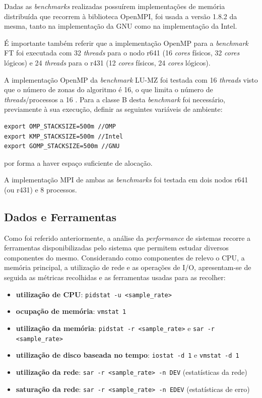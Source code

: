 \documentclass{article}
\begin{document}
Dadas as \textit{benchmarks} realizadas possuírem implementações de memória distribuída que recorrem à biblioteca OpenMPI, foi usada a versão
1.8.2 da mesma, tanto na implementação da GNU como na implementação da Intel.

É importante também referir que a implementação OpenMP para a \textit{benchmark} FT foi executada com 32 \textit{threads} para o nodo r641 
(16 \textit{cores} físicos, 32 \textit{cores} lógicos) e 24 \textit{threads} para o r431 (12 \textit{cores} físicos, 24 \textit{cores} lógicos).

A implementação OpenMP da \textit{benchmark} LU-MZ foi testada com 16 \textit{threads} visto que o número de zonas do algoritmo é 16, o que limita o número 
de \textit{threads}/processos a 16 \cite{lumzLimitProcs}. Para a classe B desta \textit{benchmark} foi necessário, previamente à sua execução, definir as 
seguintes variáveis de ambiente:
\begin{verbatim}
export OMP_STACKSIZE=500m //OMP
export KMP_STACKSIZE=500m //Intel
export GOMP_STACKSIZE=500m //GNU
\end{verbatim}
por forma a haver espaço suficiente de alocação.

A implementação MPI de ambas as \textit{benchmarks} foi testada em dois nodos r641 (ou r431) e 8 processos.


\subsection{Dados e Ferramentas}

\quad Como foi referido anteriormente, a análise da \textit{performance} de sistemas recorre a ferramentas disponibilizadas pelo sistema que 
permitem estudar diversos componentes do mesmo.
Considerando como componentes de relevo o CPU, a memória principal, a utilização de rede e as operações de I/O, apresentam-se de seguida
as métricas recolhidas e as ferramentas usadas para as recolher: 
\begin{itemize}
    \item \textbf{utilização de CPU}: \texttt{pidstat -u <sample\_rate>}
    \item \textbf{ocupação de memória}: \texttt{vmstat 1}
    \item \textbf{utilização da memória}: \texttt{pidstat -r <sample\_rate>} e \texttt{sar -r <sample\_rate>}
    \item \textbf{utilização de disco baseada no tempo}: \texttt{iostat -d 1} e \texttt{vmstat -d 1}
    \item \textbf{utilização da rede}: \texttt{sar -r <sample\_rate> -n DEV} (estatísticas da rede)
    \item \textbf{saturação da rede}: \texttt{sar -r <sample\_rate> -n EDEV} (estatísticas de erro)
\end{itemize}
\end{document}

